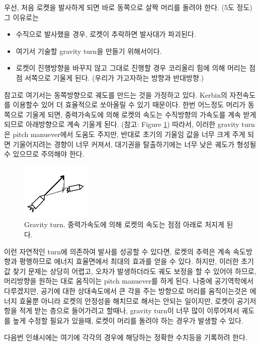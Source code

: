 \documentclass[9pt]{amsbook}
\begin{document}
우선, 처음 로켓을 발사하게 되면 바로 동쪽으로 살짝 머리를 돌려야 한다. (5도 정도) 그 이유로는 
\begin{itemize}
\item 수직으로 발사했을 경우, 로켓이 추락하면 발사대가 파괴된다.
\item 여기서 기술할 gravity turn을 만들기 위해서이다.
\item 로켓이 진행방향을 바꾸지 않고 그대로 진행할 경우 코리올리 힘에 의해 머리는 점점 서쪽으로 기울게 된다. (우리가 가고자하는 방향과 반대방향.)
\end{itemize}
참고로 여기서는 동쪽방향으로 궤도를 만드는 것을 가정하고 있다. Kerbin의 자전속도를 이용할수 있어 더 효율적으로 쏘아올릴 수 있기 때문이다.
한번 어느정도 머리가 동쪽으로 기울게 되면, 중력가속도에 의해 로켓의 속도는 수직방향의 가속도를 계속 받게 되므로 아래방향으로 계속 기울게 된다. (참고: Figure \ref{fig:gravturn})
따라서, 이러한 gravity turn은 pitch manuever에서 도움도 주지만, 반대로 초기의 기울임 값을 너무 크게 주게 되면 기울어지려는 경향이 너무 커져서, 대기권을 탈출하기에는 너무 낮은 궤도가 형성될수 있으므로 주의해야 한다.

\begin{figure}
\caption{Gravity turn. 중력가속도에 의해 로켓의 속도는 점점 아래로 처지게 된다.}
\label{fig:gravturn}
\includegraphics[width = 0.3\textwidth]{gravityturn.png}
\end{figure}

이런 자연적인 turn에 의존하여 발사를 성공할 수 있다면, 로켓의 추력은 계속 속도방향과 평행하므로 에너지 효율면에서 최대의 효과를 얻을 수 있다. 하지만, 이러한 초기값 찾기 문제는 상당히 어렵고, 오차가 발생하더라도 궤도 보정을 할 수 있어야 하므로, 머리방향을 원하는 대로 움직이는 pitch manuever를 하게 된다. 
나중에 공기역학에서 다루겠지만, 공기에 대한 상대속도에서 큰 각을 주는 방향으로 머리를 움직이는것은 에너지 효율뿐 아니라 로켓의 안정성을 해치므로 해서는 안되는 일이지만,
로켓이 공기저항을 적게 받는 층으로 들어가려고 할때나, gravity turn이 너무 많이 이루어져서 궤도를 높게 수정할 필요가 있을때, 로켓이 머리를 돌려야 하는 경우가 발생할 수 있다.

다음번 인쇄시에는 여기에 각각의 경우에 해당하는 정확한 수치등을 기록하려 한다.
\end{document}
